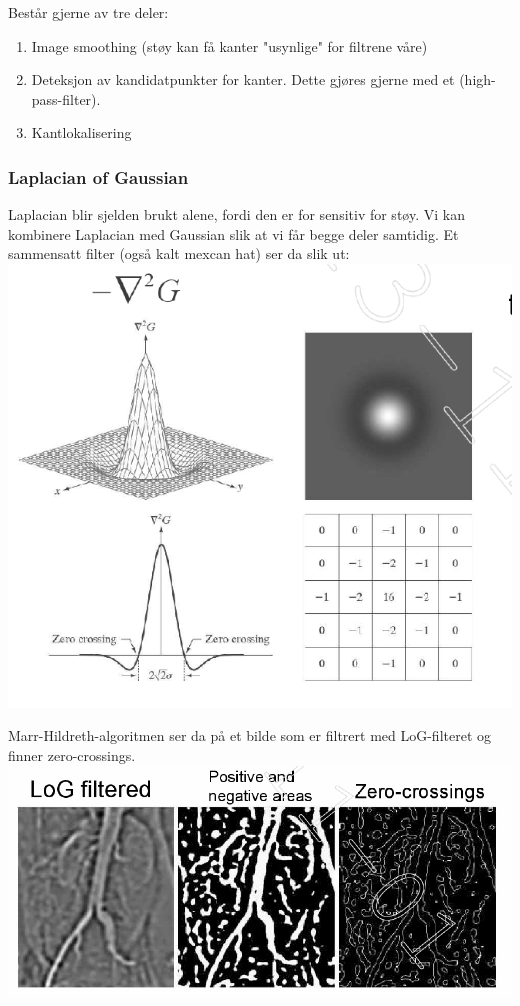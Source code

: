 Består gjerne av tre deler:
\begin{enumerate}
    \item Image smoothing (støy kan få kanter "usynlige" for filtrene våre)
    \item Deteksjon av kandidatpunkter for kanter. Dette gjøres gjerne med et (high-pass-filter).
    \item Kantlokalisering
\end{enumerate}

\subsubsection{Laplacian of Gaussian}
Laplacian blir sjelden brukt alene, fordi den er for sensitiv for støy. Vi kan kombinere Laplacian med Gaussian slik at vi får begge deler samtidig. Et sammensatt filter (også kalt mexcan hat) ser da slik ut:
\\ \includegraphics[width=\textwidth]{Bilder/mexican.PNG}

Marr-Hildreth-algoritmen ser da på et bilde som er filtrert med LoG-filteret og finner zero-crossings.
\\ \includegraphics[width=\textwidth]{Bilder/log.png}

